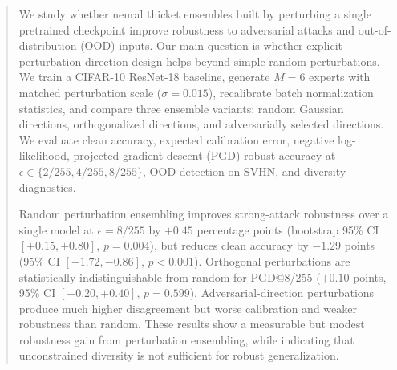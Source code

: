\begin{abstract}
We study whether neural thicket ensembles built by perturbing a single pretrained checkpoint improve robustness to adversarial attacks and out-of-distribution (OOD) inputs. Our main question is whether explicit perturbation-direction design helps beyond simple random perturbations. We train a CIFAR-10 ResNet-18 baseline, generate $M=6$ experts with matched perturbation scale ($\sigma=0.015$), recalibrate batch normalization statistics, and compare three ensemble variants: random Gaussian directions, orthogonalized directions, and adversarially selected directions. We evaluate clean accuracy, expected calibration error, negative log-likelihood, projected-gradient-descent (PGD) robust accuracy at $\epsilon\in\{2/255,4/255,8/255\}$, OOD detection on SVHN, and diversity diagnostics.

Random perturbation ensembling improves strong-attack robustness over a single model at $\epsilon=8/255$ by $+0.45$ percentage points (bootstrap 95\% CI $[+0.15,+0.80]$, $p=0.004$), but reduces clean accuracy by $-1.29$ points (95\% CI $[-1.72,-0.86]$, $p<0.001$). Orthogonal perturbations are statistically indistinguishable from random for PGD@8/255 ($+0.10$ points, 95\% CI $[-0.20,+0.40]$, $p=0.599$). Adversarial-direction perturbations produce much higher disagreement but worse calibration and weaker robustness than random. These results show a measurable but modest robustness gain from perturbation ensembling, while indicating that unconstrained diversity is not sufficient for robust generalization.
\end{abstract}
